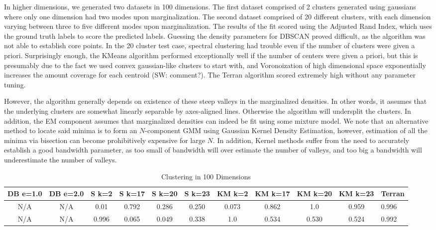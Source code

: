 \documentclass{acm_proc_article-sp}
\begin{document}
In higher dimensions, we generated two datasets in 100 dimensions. The first dataset comprised of 2 clusters generated using gaussians where only one dimension had two modes upon marginalization. The second dataset comprised of 20 different clusters, with each dimension varying between three to five different modes upon marginalization. The results of the fit scored using the Adjusted Rand Index, which uses the ground truth labels to score the predicted labels. Guessing the density parameters for DBSCAN proved difficult, as the algorithm was not able to establish core points. In the 20 cluster test case, spectral clustering had trouble even if the number of clusters were given a priori. Surprisingly enough, the KMeans algorithm performed exceptionally well if the number of centers were given a priori, but this is presumably due to the fact we used convex gaussian-like clusters to start with, and Voronoization of high dimensional space exponentially increases the amount coverage for each centroid (SW: comment?). The Terran algorithm scored extremely high without any parameter tuning. 

However, the algorithm generally depends on existence of these steep valleys in the marginalized densities. In other words, it assumes that the underlying clusters are somewhat linearly separable by axes-aligned lines. Otherwise the algorithm will undersplit the clusters. In addition, the EM component assumes that marginalized densities can indeed be fit using some mixture model. We note that an alternative method to locate said minima is to form an $N$-component GMM using Gaussian Kernel Density Estimation, however, estimation of all the minima via bisection can become prohibitively expensive for large $N$. In addition, Kernel methods suffer from the need to accurately establish a good bandwidth parameter, as too small of bandwidth will over estimate the number of valleys, and too big a bandwidth will underestimate the number of valleys. 

\begin{table*}
\centering
\caption{Clustering in 100 Dimensions}
\begin{tabular}{|c|c|c|c|c|c|c|c|c|c|l|} \hline
DB e=1.0 & DB e=2.0 & S k=2 & S k=17 & S k=20 & S k=23 & KM k=2 & KM k=17 & KM k=20 & KM k=23 & Terran \\ \hline
N/A & N/A & 0.01 & 0.792 & 0.286 & 0.250 & 0.073 & 0.862 & 1.0 & 0.959 & 0.996\\ \hline
N/A & N/A & 0.996 & 0.065 & 0.049 & 0.338 & 1.0 & 0.534 & 0.530 & 0.524 & 0.992\\ \hline \end{tabular}
\end{table*}
\end{document}
